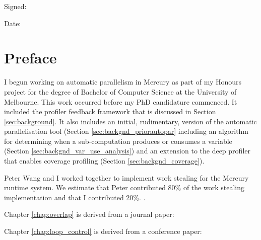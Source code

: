 \documentclass[a4paper,twoside]{report}
\begin{document}
\vspace{1em}

\noindent Signed:

\vspace{1em}

\noindent Date:

\chapter*{Preface}

I begun working on automatic parallelism in Mercury as part of my Honours project
for the degree of Bachelor of Computer Science at the University of Melbourne.
This work occurred before my PhD candidature commenced.
It included the profiler feedback framework that is discussed in Section
\ref{sec:background}.
It also includes an initial, rudimentary, version of the automatic
parallelisation tool
(Section \ref{sec:backgnd_priorautopar}
including an algorithm for determining when a sub-computation produces or
consumes a variable (Section \ref{sec:backgnd_var_use_analysis})
and an extension to the deep profiler that enables coverage profiling
(Section \ref{sec:backgnd_coverage}).

Peter Wang and I worked together to implement work stealing for the Mercury
runtime system.
We estimate that Peter contributed 80\% of the work stealing implementation
and that I contributed 20\%.
.

Chapter \ref{chap:overlap} is derived from a journal paper:


\begin{quote}
\end{quote}


Chapter \ref{chap:loop_control} is derived from a conference paper:
\end{document}
